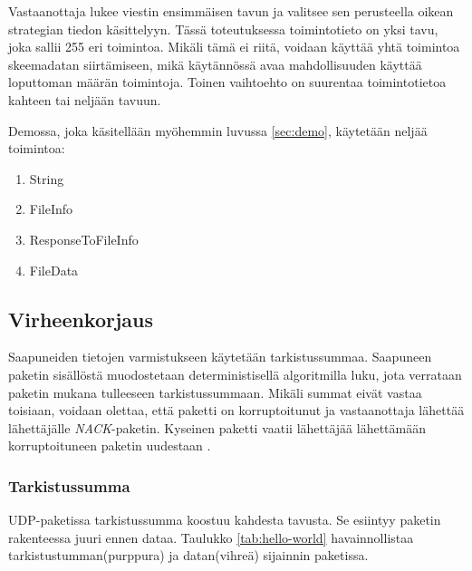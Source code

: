 \documentclass[a4paper,12pt]{article}
\begin{document}
    Vastaanottaja lukee viestin ensimmäisen tavun ja valitsee sen perusteella oikean strategian tiedon käsittelyyn. Tässä toteutuksessa toimintotieto on yksi tavu, joka sallii 255 eri toimintoa. Mikäli tämä ei riitä, voidaan käyttää yhtä toimintoa skeemadatan siirtämiseen, mikä käytännössä avaa mahdollisuuden käyttää loputtoman määrän toimintoja. Toinen vaihtoehto on suurentaa toimintotietoa kahteen tai neljään tavuun. \par

    Demossa, joka käsitellään myöhemmin luvussa \ref{sec:demo}, käytetään neljää toimintoa:
    \begin{enumerate}
        \item String
        \item FileInfo
        \item ResponseToFileInfo
        \item FileData
    \end{enumerate}


    \subsection{Virheenkorjaus}\label{sec:virheenkorjaus}
    Saapuneiden tietojen varmistukseen käytetään tarkistussummaa. Saapuneen paketin sisällöstä muodostetaan deterministisellä algoritmilla luku, jota verrataan paketin mukana tulleeseen tarkistussummaan. Mikäli summat eivät vastaa toisiaan, voidaan olettaa, että paketti on korruptoitunut ja vastaanottaja lähettää lähettäjälle \textit{NACK}-paketin. Kyseinen paketti vaatii lähettäjää lähettämään korruptoituneen paketin uudestaan
    \cite{khan-udp}.

    \subsubsection{Tarkistussumma}

    UDP-paketissa tarkistussumma koostuu kahdesta tavusta. Se esiintyy paketin rakenteessa juuri ennen dataa. Taulukko \ref{tab:hello-world} havainnollistaa tarkistustumman(purppura) ja datan(vihreä) sijainnin paketissa.
\end{document}
